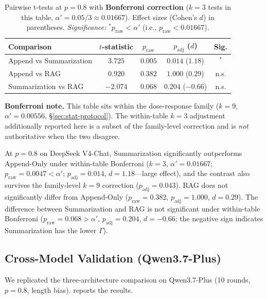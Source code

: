 \documentclass[11pt]{article}
\begin{document}
\begin{table}[htbp]
\centering
\caption{Pairwise t-tests at $p=0.8$ with \textbf{Bonferroni correction} ($k=3$ tests in this table, $\alpha' = 0.05/3 \approx 0.01667$). Effect sizes (Cohen's $d$) in parentheses. \emph{Significance:} $^{*}p_{\text{raw}} < \alpha'$ (i.e., $p_{\text{raw}} < 0.01667$).}
\label{tab:stats}
\begin{tabular}{lcccc}
\toprule
Comparison & $t$-statistic & $p_{\text{raw}}$ & $p_{\text{adj}}$ ($d$) & Sig. \\
\midrule
Append vs Summarization & $3.725$ & $0.005$ & $0.014$ ($1.18$) & $^{*}$ \\
Append vs RAG & $0.920$ & $0.382$ & $1.000$ ($0.29$) & n.s. \\
Summarization vs RAG & $-2.074$ & $0.068$ & $0.204$ ($-0.66$) & n.s. \\
\bottomrule
\end{tabular}
\par\smallskip
{\small\textbf{Bonferroni note.} This table sits within the dose-response family ($k=9$, $\alpha' = 0.00556$, \S\ref{sec:stat-protocol}). The within-table $k=3$ adjustment additionally reported here is a subset of the family-level correction and is \emph{not} authoritative when the two disagree.}
\end{table}

At $p=0.8$ on DeepSeek V4-Chat, Summarization significantly outperforms Append-Only under within-table Bonferroni ($k=3$, $\alpha'=0.01667$; $p_{\text{raw}}=0.0047 < \alpha'$; $p_{\text{adj}}=0.014$, $d=1.18$---large effect), and the contrast also survives the family-level $k{=}9$ correction ($p_{\text{adj}}=0.043$). RAG does not significantly differ from Append-Only ($p_{\text{raw}}=0.382$, $p_{\text{adj}}=1.000$, $d=0.29$). The difference between Summarization and RAG is not significant under within-table Bonferroni ($p_{\text{raw}}=0.068 > \alpha'$, $p_{\text{adj}}=0.204$, $d=-0.66$; the negative sign indicates Summarization has the lower $\Gamma$).

\subsection{Cross-Model Validation (Qwen3.7-Plus)}

We replicated the three-architecture comparison on Qwen3.7-Plus (10 rounds, $p=0.8$, length bias).  reports the results.
\end{document}

